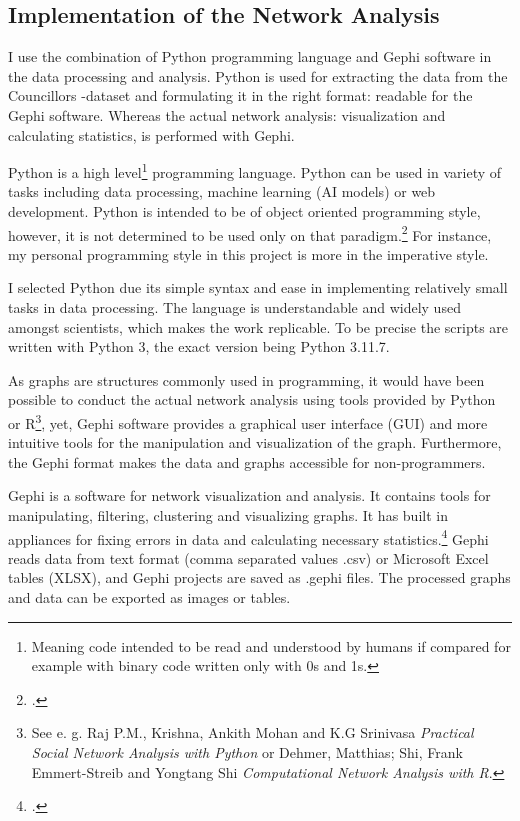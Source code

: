 \subsection{Implementation of the Network Analysis}
I use the combination of Python programming language and Gephi software in the data processing and analysis. Python is used for extracting the data from the Councillors -dataset and formulating it in the right format: readable for the Gephi software. Whereas the actual network analysis: visualization and calculating statistics, is performed with Gephi. 

Python is a high level\footnote{Meaning code intended to be read and understood by humans if compared for example with binary code written only with 0s and 1s.} programming language. Python can be used in variety of tasks including data processing, machine learning (AI models) or web development. Python is intended to be of object oriented programming style, however, it is not determined to be used only on that paradigm.\footcite[p. 1.]{pythonbook} For instance, my personal programming style in this project is more in the imperative style. 

I selected Python due its simple syntax and ease in implementing relatively small tasks in data processing. The language is understandable and widely used amongst scientists, which makes the work replicable. To be precise the scripts are written with Python 3, the exact version being Python 3.11.7.

As graphs are structures commonly used in programming, it would have been possible to conduct the actual network analysis using tools provided by Python or R\footnote{See e. g. Raj P.M., Krishna, Ankith Mohan and K.G Srinivasa \textit{Practical Social Network Analysis with Python} or Dehmer, Matthias; Shi, Frank Emmert-Streib and Yongtang Shi \textit{Computational Network Analysis with R}.}, yet, Gephi software provides a graphical user interface (GUI) and more intuitive tools for the manipulation and visualization of the graph. Furthermore, the Gephi format makes the data and graphs accessible for non-programmers.

Gephi is a software for network visualization and analysis. It contains tools for manipulating, filtering, clustering and visualizing graphs. It has built in appliances for fixing errors in data and calculating necessary statistics.\footcite{gephi} Gephi reads data from text format (comma separated values .csv) or Microsoft Excel tables (XLSX), and Gephi projects are saved as .gephi files. The processed graphs and data can be exported as images or tables.  


